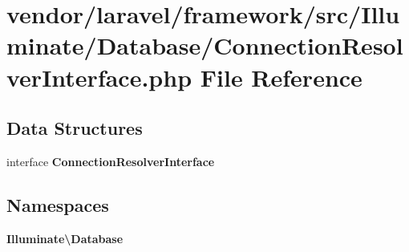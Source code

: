 \section{vendor/laravel/framework/src/\+Illuminate/\+Database/\+Connection\+Resolver\+Interface.php File Reference}
\label{_connection_resolver_interface_8php}
\subsection*{Data Structures}
\begin{DoxyCompactItemize}
\item 
interface {\bf Connection\+Resolver\+Interface}
\end{DoxyCompactItemize}
\subsection*{Namespaces}
\begin{DoxyCompactItemize}
\item 
 {\bf Illuminate\textbackslash{}\+Database}
\end{DoxyCompactItemize}
